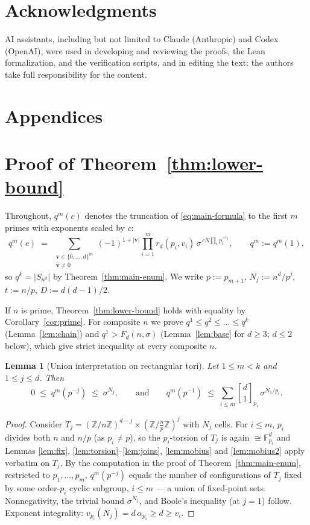 \documentclass[11pt,a4paper]{article}
\newtheorem{lemma}[theorem]{Lemma}
\theoremstyle{remark}
\newcommand{\ZZ}{\mathbb{Z}}
\newcommand{\FF}{\mathbb{F}}
\newcommand{\vv}{\mathbf{v}}
\newcommand{\gaussbinom}[2]{\genfrac{[}{]}{0pt}{}{#1}{#2}}
\begin{document}
\section*{Acknowledgments}
AI assistants, including but not limited to Claude (Anthropic) and Codex (OpenAI), were used in developing and reviewing the proofs, the Lean formalization, and the verification scripts, and in editing the text; the authors take full responsibility for the content.

\appendix\section*{Appendices}
\section{Proof of Theorem~\ref{thm:lower-bound}}\label{app:lower}

Throughout, $q^m(c)$ denotes the truncation of \eqref{eq:main-formula} to
the first $m$ primes with exponents scaled by $c$:
\[
  q^m(c)\;=\;\sum_{\substack{\vv\in\{0,\dots,d\}^m\\\vv\neq0}}
  (-1)^{1+|\vv|}\prod_{i=1}^m r_d(p_i,v_i)\,
  \sigma^{\,cN\prod_i p_i^{-v_i}},\qquad q^m:=q^m(1),
\]
so $q^k=|S_{n^d}|$ by Theorem~\ref{thm:main-enum}. We write $p:=p_{m+1}$,
$N_j:=n^d/p^j$, $t:=n/p$, $D:=d(d-1)/2$.

If $n$ is prime, Theorem~\ref{thm:lower-bound} holds with equality by
Corollary~\ref{cor:prime}. For composite $n$ we prove
$q^1\le q^2\le\dots\le q^k$ (Lemma~\ref{lem:chain}) and
$q^1>F_d(n,\sigma)$ (Lemma~\ref{lem:base} for $d\ge3$; $d\le2$ below),
which give strict inequality at every composite $n$.

\begin{lemma}[Union interpretation on rectangular tori]\label{lem:dtorus}
Let $1\le m<k$ and $1\le j\le d$. Then
\[
  0\;\le\;q^m(p^{-j})\;\le\;\sigma^{N_j},
  \qquad\text{and}\qquad
  q^m(p^{-1})\;\le\;\sum_{i\le m}\gaussbinom d1_{p_i}\,\sigma^{N_1/p_i}.
\]
\end{lemma}

\begin{proof}
Consider $T_j=(\ZZ/n\ZZ)^{d-j}\times(\ZZ/\tfrac np\ZZ)^{j}$ with
$N_j$ cells. For $i\le m$, $p_i$ divides both $n$ and $n/p$ (as
$p_i\neq p$), so the $p_i$-torsion of $T_j$ is again $\cong\FF_{p_i}^d$
and Lemmas \ref{lem:fix}, \ref{lem:torsion}--\ref{lem:joins}, \ref{lem:mobius} and \ref{lem:mobius2} apply
verbatim on $T_j$. By the computation in the proof of
Theorem~\ref{thm:main-enum}, restricted to $p_1,\dots,p_m$,
$q^m(p^{-j})$ equals the number of configurations of $T_j$ fixed by some
order-$p_i$ cyclic subgroup, $i\le m$ --- a union of fixed-point sets.
Nonnegativity, the trivial bound $\sigma^{N_j}$, and Boole's inequality
(at $j=1$) follow. Exponent integrality:
$v_{p_i}(N_j)=d\,\alpha_{p_i}\ge d\ge v_i$.
\end{proof}
\end{document}
